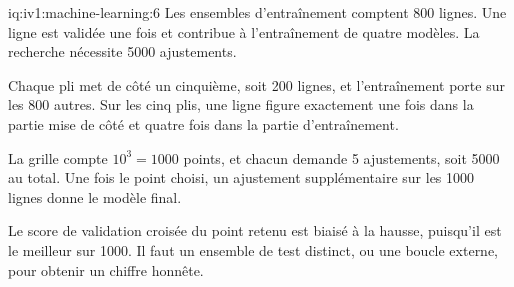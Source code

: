 \begin{solution}{iq:iv1:machine-learning:6}
Les ensembles d'entraînement comptent 800 lignes. Une ligne est validée une fois et contribue à l'entraînement de quatre modèles. La recherche nécessite 5000 ajustements.

Chaque pli met de côté un cinquième, soit 200 lignes, et l'entraînement porte sur les 800 autres. Sur les cinq plis, une ligne figure exactement une fois dans la partie mise de côté et quatre fois dans la partie d'entraînement.

La grille compte $10^3 = 1000$ points, et chacun demande 5 ajustements, soit 5000 au total. Une fois le point choisi, un ajustement supplémentaire sur les 1000 lignes donne le modèle final.

Le score de validation croisée du point retenu est biaisé à la hausse, puisqu'il est le meilleur sur 1000. Il faut un ensemble de test distinct, ou une boucle externe, pour obtenir un chiffre honnête.



\end{solution}


